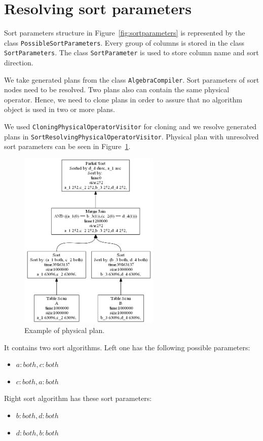 \section{Resolving sort parameters}

Sort parameters structure in Figure~\ref{fig:sortparameters} is represented by the class \texttt{Possible\-Sort\-Parameters}. Every group of columns is stored in the class \texttt{SortParameters}. The class \texttt{SortParameter} is used to store column name and sort direction.


We take generated plans from the class \texttt{AlgebraCompiler}. Sort parameters of sort nodes need to be resolved. Two plans also can contain the same physical operator. Hence, we need to clone plans in order to assure that no algorithm object is used in two or more plans.

We used \texttt{CloningPhysicalOperatorVisitor} for cloning and we resolve generated plans in \texttt{SortResolvingPhysicalOperatorVisitor}. Physical plan with unresolved sort parameters can be seen in Figure~\ref{fig:plansortunresolved}.
\begin{figure}[h!]
  \centering
    \includegraphics[width=0.6\textwidth]{plansortunresolved}

      \caption{Example of physical plan.}
          \label{fig:plansortunresolved}
\end{figure}
\noindent
It contains two sort algorithms. Left one has the following possible parameters:

\begin{itemize}
\item $a:both, c:both$
\item $c:both, a:both$
\end{itemize}
Right sort algorithm has these sort parameters:
\begin{itemize}
\item $b:both, d:both$
\item $d:both, b:both$
\end{itemize}

